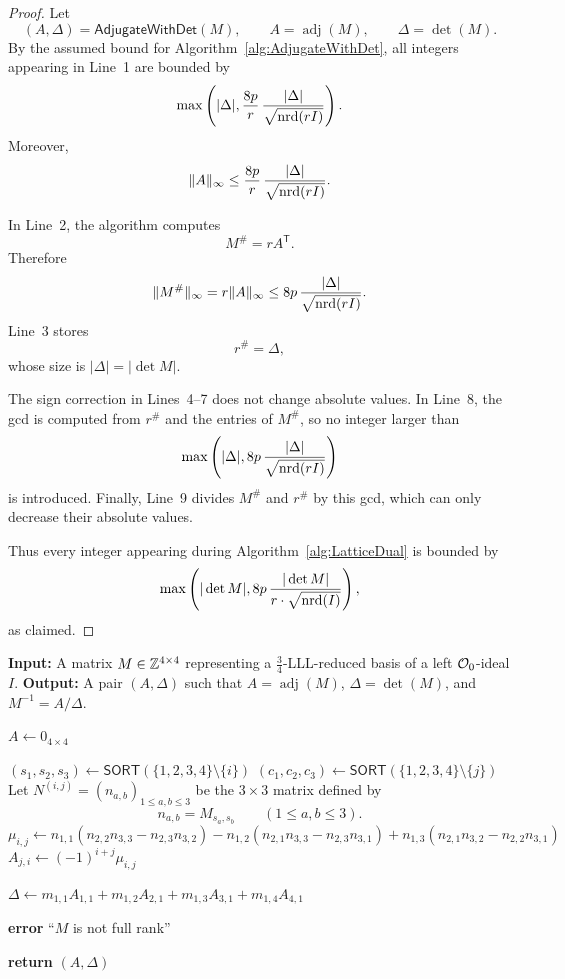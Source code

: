 \begin{proof}
Let
\[
  (A,\Delta)=\mathsf{AdjugateWithDet}(M),
  \qquad
  A=\operatorname{adj}(M),
  \qquad
  \Delta=\det(M).
\]
By the assumed bound for Algorithm~\ref{alg:AdjugateWithDet}, all integers
appearing in Line~1 are bounded by
\[
  \max\left(
    |\Delta|,
    \frac{8p}{r}\,
    \frac{|\Delta|}{\sqrt{\mathrm{nrd}(rI)}}
  \right).
\]
Moreover,
\[
  \|A\|_\infty
  \le
  \frac{8p}{r}\,
  \frac{|\Delta|}{\sqrt{\mathrm{nrd}(rI)}} .
\]

In Line~2, the algorithm computes
\[
  M^\#=rA^{\mathsf T}.
\]
Therefore
\[
  \|M^\#\|_\infty
  =
  r\|A\|_\infty
  \le
  8p\,\frac{|\Delta|}{\sqrt{\mathrm{nrd}(rI)}} .
\]
Line~3 stores
\[
  r^\#=\Delta,
\]
whose size is \(|\Delta|=|\det M|\).

The sign correction in Lines~4--7 does not change absolute values.  In Line~8,
the gcd is computed from \(r^\#\) and the entries of \(M^\#\), so no integer larger
than
\[
  \max\left(
    |\Delta|,
    8p\,\frac{|\Delta|}{\sqrt{\mathrm{nrd}(rI)}}
  \right)
\]
is introduced.  Finally, Line~9 divides \(M^\#\) and \(r^\#\) by this gcd, which can
only decrease their absolute values.

Thus every integer appearing during Algorithm~\ref{alg:LatticeDual} is bounded by
\[
  \max\left(
    |\det M|,
    8p\,\frac{|\det M|}{r\cdot \sqrt{\mathrm{nrd}(I)}}
  \right),
\]
as claimed.
\end{proof}

\begin{algorithm}
\caption{AdjugateWithDet($M$)}
\label{alg:AdjugateWithDet}
\begin{algorithmic}[1]
  \Statex \textbf{Input:} A matrix $M\in\mathbb{Z}^{4\times4}$ representing a $\frac34$-LLL-reduced basis of a left $\mathcal{O}_0$-ideal $I$.
  \Statex \textbf{Output:} A pair $(A,\Delta)$ such that
  $A=\operatorname{adj}(M)$, $\Delta=\det(M)$, and
  $M^{-1}=A/\Delta$.

  \State $A \gets 0_{4\times 4}$

      \State $(s_1,s_2,s_3)\gets\mathsf{SORT}(\{1,2,3,4\}\setminus\{i\})$
      \State $(c_1,c_2,c_3)\gets\mathsf{SORT}(\{1,2,3,4\}\setminus\{j\})$
      \State Let $N^{(i,j)}=(n_{a,b})_{1\le a,b\le 3}$ be the $3\times 3$ matrix
      defined by
      \[
        n_{a,b}=M_{s_a,s_b}
        \qquad (1\le a,b\le 3).
      \]
      \State $\mu_{i,j} \gets
      n_{1,1}(n_{2,2}n_{3,3}-n_{2,3}n_{3,2})
      -n_{1,2}(n_{2,1}n_{3,3}-n_{2,3}n_{3,1})
      +n_{1,3}(n_{2,1}n_{3,2}-n_{2,2}n_{3,1})$
      \State $A_{j,i} \gets (-1)^{i+j}\mu_{i,j}$
    \EndFor
  \EndFor

  \State $\Delta \gets
  m_{1,1}A_{1,1}
  +m_{1,2}A_{2,1}
  +m_{1,3}A_{3,1}
  +m_{1,4}A_{4,1}$

    \State \textbf{error} ``$M$ is not full rank''
  \EndIf

  \State \textbf{return} $(A,\Delta)$
\end{algorithmic}
\end{algorithm}

